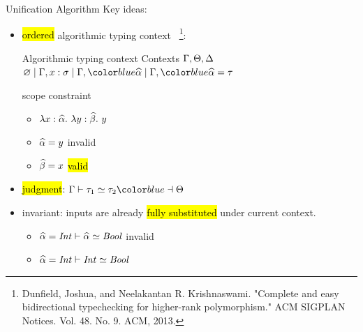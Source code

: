 \documentclass{beamer}
\begin{document}
\begin{frame}{Unification Algorithm}
  Key ideas:
  \begin{itemize}
  \item \hl{ordered} algorithmic typing context
    ~\footnote{Dunfield, Joshua, and Neelakantan R. Krishnaswami. "Complete and
      easy bidirectional typechecking for higher-rank polymorphism." ACM SIGPLAN
      Notices. Vol. 48. No. 9. ACM, 2013.}:
    \begin{block}{Algorithmic typing context}
      Contexts
      $\Gamma, \Theta, \Delta$  \syndef $\ctxinit \mid \tctx,x:\sigma
      \mid \tctx, \hl{\genA}
      \mid \tctx, \hl{\genA = \tau} $
    \end{block}
    scope constraint
    \begin{itemize}
      \item $\lambda x:\widehat{\alpha}.~ {\lambda y:\widehat{\beta}.~} y$
      \item $\widehat{\alpha} = y$ \alert{invalid}
      \item $\widehat{\beta} = x$ \hl{valid}
    \end{itemize}
  \item<2-> \hl{judgment}: $\tctx \byuni \tau_1 \uni \tau_2 \hl{\toctx}$
  \item<3-> invariant: inputs are already \hl{fully substituted} under current context.
    \begin{itemize}
      \item $\widehat{\alpha} = \mathit{Int} \vdash \widehat{\alpha} \simeq \mathit{Bool}$ \alert{invalid}
      \item $\widehat{\alpha} = \mathit{Int} \vdash \mathit{Int} \simeq \mathit{Bool}$
    \end{itemize}
  \end{itemize}
\end{frame}
\end{document}
